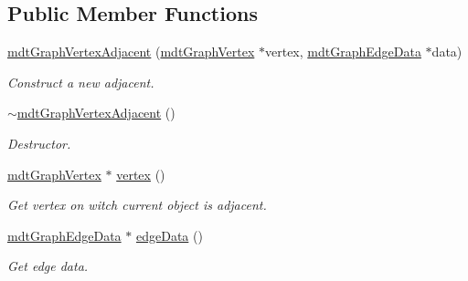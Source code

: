 \subsection*{Public Member Functions}
\begin{DoxyCompactItemize}
\item 
\hyperlink{classmdt_graph_vertex_adjacent_adfc7d4581ab9f6230b88e2393350437e}{mdtGraphVertexAdjacent} (\hyperlink{classmdt_graph_vertex}{mdtGraphVertex} $\ast$vertex, \hyperlink{classmdt_graph_edge_data}{mdtGraphEdgeData} $\ast$data)
\begin{DoxyCompactList}\small\item\em Construct a new adjacent. \end{DoxyCompactList}\item 
\hypertarget{classmdt_graph_vertex_adjacent_ab9a4523b795afbeb4000d4a7bfcecc80}{
\hyperlink{classmdt_graph_vertex_adjacent_ab9a4523b795afbeb4000d4a7bfcecc80}{$\sim$mdtGraphVertexAdjacent} ()}
\label{classmdt_graph_vertex_adjacent_ab9a4523b795afbeb4000d4a7bfcecc80}

\begin{DoxyCompactList}\small\item\em Destructor. \end{DoxyCompactList}\item 
\hypertarget{classmdt_graph_vertex_adjacent_abaaf9dfaf38ba860835e57b402251969}{
\hyperlink{classmdt_graph_vertex}{mdtGraphVertex} $\ast$ \hyperlink{classmdt_graph_vertex_adjacent_abaaf9dfaf38ba860835e57b402251969}{vertex} ()}
\label{classmdt_graph_vertex_adjacent_abaaf9dfaf38ba860835e57b402251969}

\begin{DoxyCompactList}\small\item\em Get vertex on witch current object is adjacent. \end{DoxyCompactList}\item 
\hypertarget{classmdt_graph_vertex_adjacent_a64c128071b9f012e7ec9289dee7f6175}{
\hyperlink{classmdt_graph_edge_data}{mdtGraphEdgeData} $\ast$ \hyperlink{classmdt_graph_vertex_adjacent_a64c128071b9f012e7ec9289dee7f6175}{edgeData} ()}
\label{classmdt_graph_vertex_adjacent_a64c128071b9f012e7ec9289dee7f6175}

\begin{DoxyCompactList}\small\item\em Get edge data. \end{DoxyCompactList}\end{DoxyCompactItemize}


